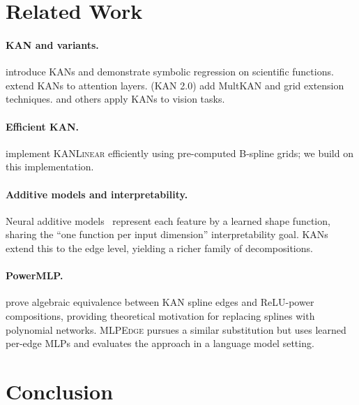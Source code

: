 \documentclass{article}
\newcommand{\mlpedge}{\textsc{MLPEdge}}
\newcommand{\kanlinear}{\textsc{KANLinear}}
\begin{document}
\section{Related Work}
\label{sec:related}

\paragraph{KAN and variants.}
\citet{liu2024kan} introduce KANs and demonstrate symbolic regression on
scientific functions. \citet{yang2024kat} extend KANs to attention layers.
\citet{liu2024kan2} (KAN 2.0) add MultKAN and grid extension techniques.
\citet{bodner2024convolutional} and others apply KANs to vision tasks.

\paragraph{Efficient KAN.}
\citet{blealtan2024efficientkan} implement \kanlinear{} efficiently using
pre-computed B-spline grids; we build on this implementation.

\paragraph{Additive models and interpretability.}
Neural additive models~\citep{agarwal2021neural} represent each feature by a
learned shape function, sharing the ``one function per input dimension''
interpretability goal.
KANs extend this to the edge level, yielding a richer family of decompositions.

\paragraph{PowerMLP.}
\citet{tang2025powermlp} prove algebraic equivalence between KAN spline
edges and ReLU-power compositions, providing theoretical motivation
for replacing splines with polynomial networks.
\mlpedge{} pursues a similar substitution but uses learned per-edge MLPs and
evaluates the approach in a language model setting.

\section{Conclusion}
\label{sec:conclusion}
\end{document}
